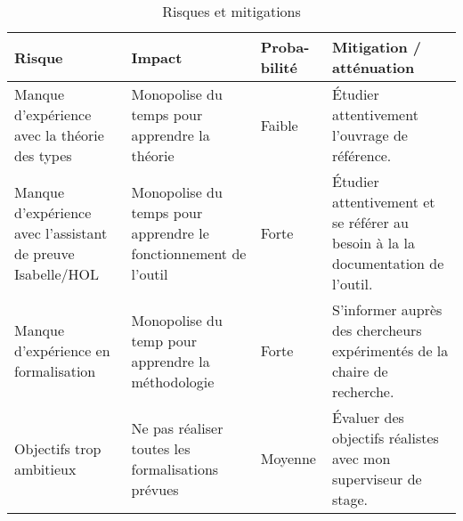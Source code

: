 \documentclass[a4paper, oneside, 12pt, titlepage, draft]{article}
\begin{document}


\begin{table}[h]
  \caption{Risques et mitigations}
  \begin{tabular}{|p{}|p{}|p{}|p{}|}
    \hline
    \textbf{Risque} &
    \textbf{Impact} &
    \textbf{Proba-bilité} &
    \textbf{Mitigation / \newline atténuation} \\
    \hline
    Manque d'expérience avec la théorie des types &
    Monopolise du temps pour apprendre la théorie &
    Faible &
    Étudier attentivement l'ouvrage de référence. \\
    \hline
    Manque d'expérience avec l'assistant de preuve Isabelle/HOL &
    Monopolise du temps pour apprendre le fonctionnement de l'outil &
    Forte &
    Étudier attentivement et se référer au besoin à la la documentation de l'outil. \\
    \hline
    Manque d'expérience en formalisation &
    Monopolise du temp pour apprendre la méthodologie &
    Forte &
    S'informer auprès des chercheurs expérimentés de la chaire de recherche. \\
    \hline
    Objectifs trop ambitieux &
    Ne pas réaliser toutes les formalisations prévues &
    Moyenne &
    Évaluer des objectifs réalistes avec mon superviseur de stage. \\
    \hline
  \end{tabular}
\end{table}
\end{document}
